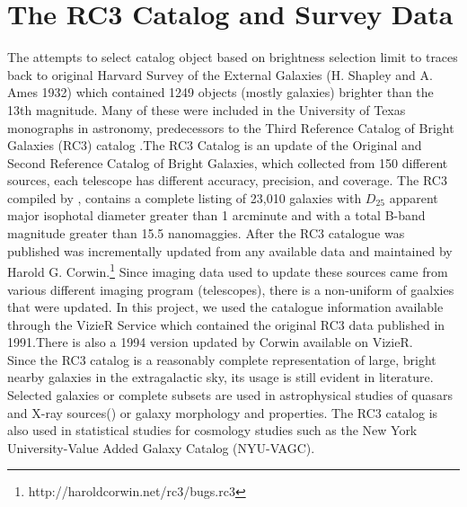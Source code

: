 \documentclass[5p]{elsarticle}
\begin{document}
\section{The RC3 Catalog and Survey Data}
The attempts to select catalog object based on brightness selection limit to traces back to original Harvard Survey of the External Galaxies (H. Shapley and A. Ames 1932) which contained 1249 objects (mostly galaxies) brighter than the 13th magnitude.
Many of these were included in the University of Texas monographs in astronomy, predecessors to the  Third Reference Catalog of Bright Galaxies (RC3) catalog .The RC3 Catalog is an update of the Original and Second Reference Catalog of Bright Galaxies, which collected from 150 different sources, each telescope has different accuracy, precision, and coverage. The RC3 compiled by \citet{rc3}, contains a  complete listing of 23,010 galaxies with $D_25$ apparent major isophotal diameter  greater than 1 arcminute and with a total B-band magnitude greater than 15.5 nanomaggies. After the RC3 catalogue was published was incrementally updated from any available data and maintained by Harold G. Corwin.\footnote{http://haroldcorwin.net/rc3/bugs.rc3} Since imaging data used to update these sources came from various different imaging program (telescopes), there is a non-uniform of gaalxies that were updated. In this project, we used the catalogue information available through the VizieR Service  which contained the original  RC3 data published in 1991.There is also a 1994 version updated by Corwin available on VizieR. 
\\
\indent  Since the RC3 catalog 
 is a reasonably complete representation of large, bright nearby galaxies in the extragalactic sky, its 
usage is still evident in literature. Selected galaxies or complete subsets are used in astrophysical studies of  quasars and X-ray sources(\citet{xray}) or  galaxy morphology and properties.  The RC3 catalog is also used in statistical studies  for cosmology studies such as the New York University-Value Added Galaxy Catalog (NYU-VAGC).
\end{document}

